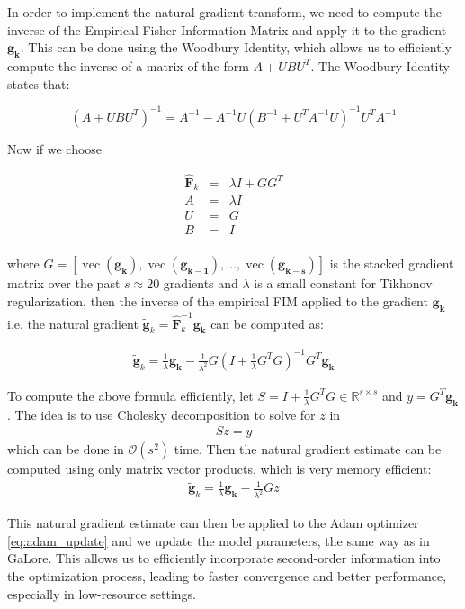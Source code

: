 In order to implement the natural gradient transform, we need to compute the inverse of the Empirical Fisher Information Matrix and apply it to the gradient \(\mathbf{g_{k}}\). This can be done using the Woodbury Identity, which allows us to efficiently compute the inverse of a matrix of the form \(A + UBU^T\). The Woodbury Identity states that:

\[
(A + UBU^T)^{-1} = A^{-1} - A^{-1}U(B^{-1} + U^TA^{-1}U)^{-1}U^TA^{-1}
\]

Now if we choose

\begin{eqnarray}
    \mathbf{\hat{F}}_{k} &=& \lambda I + GG^{T} \\
    A &=& \lambda I \\
    U &=& G \\
    B &=& I \\
\end{eqnarray}

where \(G = [\operatorname{vec}(\mathbf{g_{k}}), \operatorname{vec}(\mathbf{g_{k-1}}),\ldots, \operatorname{vec}(\mathbf{g_{k-s}})]\) is the stacked gradient matrix over the past \(s \approx 20\) gradients and \(\lambda\) is a small constant for Tikhonov regularization, then the inverse of the empirical FIM applied to the gradient \(\mathbf{g_{k}}\) i.e. the natural gradient \(\mathbf{\tilde{g}}_{k} = \mathbf{\hat{F}}_{k}^{-1}\mathbf{g_{k}}\) can be computed as:

\begin{eqnarray}
    \mathbf{\tilde{g}}_{k} = \frac{1}{\lambda}\mathbf{g_{k}} - \frac{1}{\lambda^{2}}G\left(I + \frac{1}{\lambda}G^{T}G\right)^{-1}G^{T}\mathbf{g_{k}}
\end{eqnarray}

To compute the above formula efficiently, let \(S = I + \frac{1}{\lambda}G^{T}G \in \mathbb{R}^{s\times s}\) and \(y = G^T\mathbf{g_{k}}\). The idea is to use Cholesky decomposition to solve for \(z\) in
\begin{eqnarray}
S z = y
\end{eqnarray}
which can be done in \(\mathcal{O}(s^2)\) time. Then the natural gradient estimate can be computed using only matrix vector products, which is very memory efficient:
\begin{eqnarray}
    \mathbf{\tilde{g}}_{k} = \frac{1}{\lambda}\mathbf{g_{k}} - \frac{1}{\lambda^{2}}Gz
\end{eqnarray}

This natural gradient estimate can then be applied to the Adam optimizer \ref{eq:adam_update} and we update the model parameters, the same way as in GaLore. This allows us to efficiently incorporate second-order information into the optimization process, leading to faster convergence and better performance, especially in low-resource settings.